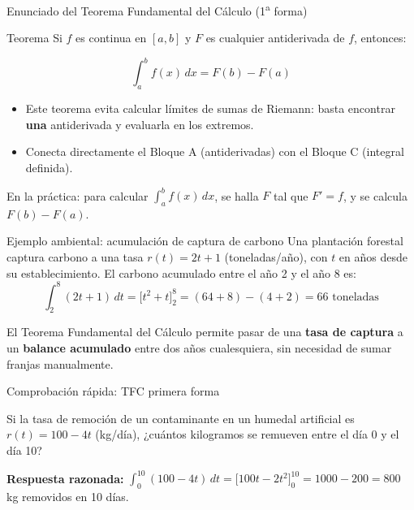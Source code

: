 \documentclass[aspectratio=169,11pt]{beamer}
\begin{document}
\begin{frame}{Enunciado del Teorema Fundamental del Cálculo (1\textsuperscript{a} forma)}
\small
\begin{block}{Teorema}
Si $f$ es continua en $[a,b]$ y $F$ es cualquier antiderivada de $f$, entonces:
\end{block}
\[
\int_{a}^{b} f(x)\,dx = F(b) - F(a)
\]
\begin{itemize}
  \item Este teorema evita calcular límites de sumas de Riemann: basta encontrar \textbf{una} antiderivada y evaluarla en los extremos.
  \item Conecta directamente el Bloque A (antiderivadas) con el Bloque C (integral definida).
\end{itemize}
\begin{keybox}
En la práctica: para calcular $\int_a^b f(x)\,dx$, se halla $F$ tal que $F'=f$, y se calcula $F(b)-F(a)$.
\end{keybox}
\end{frame}

\begin{frame}{Ejemplo ambiental: acumulación de captura de carbono}
\small
Una plantación forestal captura carbono a una tasa $r(t) = 2t + 1$ (toneladas/año), con $t$ en años desde su establecimiento. El carbono acumulado entre el año 2 y el año 8 es:
\[
\int_{2}^{8} (2t+1)\,dt = \Big[t^2+t\Big]_2^8 = (64+8)-(4+2) = 66 \text{ toneladas}
\]
\begin{keybox}
El Teorema Fundamental del Cálculo permite pasar de una \textbf{tasa de captura} a un \textbf{balance acumulado} entre dos años cualesquiera, sin necesidad de sumar franjas manualmente.
\end{keybox}
\end{frame}

\begin{frame}{Comprobación rápida: TFC primera forma}
\begin{checkbox}
Si la tasa de remoción de un contaminante en un humedal artificial es $r(t)=100-4t$ (kg/día), ¿cuántos kilogramos se remueven entre el día 0 y el día 10?
\end{checkbox}
\vspace{0.2cm}
\begin{keybox}
\textbf{Respuesta razonada:} $\displaystyle\int_0^{10}(100-4t)\,dt = \big[100t-2t^2\big]_0^{10} = 1000-200 = 800$ kg removidos en 10 días.
\end{keybox}
\end{frame}
\end{document}
